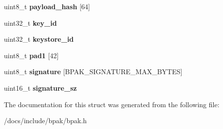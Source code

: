 \begin{DoxyCompactItemize}
\item 
\mbox{\label{structbpak__header_aa9959ada9294c1baeecb8357cc8f6e38}} 
uint8\+\_\+t {\bfseries payload\+\_\+hash} \mbox{[}64\mbox{]}
\item 
\mbox{\label{structbpak__header_a84b8b5673bb39f392ef14c32fc139db5}} 
uint32\+\_\+t {\bfseries key\+\_\+id}
\item 
\mbox{\label{structbpak__header_ae944cc2a3865901ad4345bf3dffe24f1}} 
uint32\+\_\+t {\bfseries keystore\+\_\+id}
\item 
\mbox{\label{structbpak__header_a7ad1add151bbf73045bca15e0e53d011}} 
uint8\+\_\+t {\bfseries pad1} \mbox{[}42\mbox{]}
\item 
\mbox{\label{structbpak__header_aaba938f15e66cc901e7db47e55cd829c}} 
uint8\+\_\+t {\bfseries signature} \mbox{[}B\+P\+A\+K\+\_\+\+S\+I\+G\+N\+A\+T\+U\+R\+E\+\_\+\+M\+A\+X\+\_\+\+B\+Y\+T\+ES\mbox{]}
\item 
\mbox{\label{structbpak__header_afdbaa453b3ef711df3c0a53948153330}} 
uint16\+\_\+t {\bfseries signature\+\_\+sz}
\end{DoxyCompactItemize}


The documentation for this struct was generated from the following file\+:\begin{DoxyCompactItemize}
\item 
/docs/include/bpak/bpak.\+h\end{DoxyCompactItemize}
